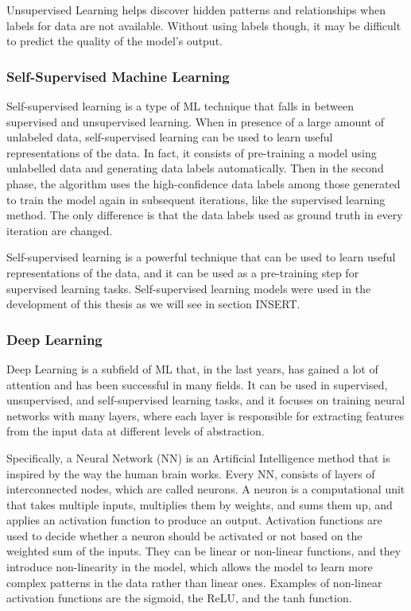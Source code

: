 Unsupervised Learning helps discover hidden patterns and relationships when labels for data are not available.
Without using labels though, it may be difficult to predict the quality of the model's output.





\subsubsection{Self-Supervised Machine Learning}
\label{sec:semisupervised_ml}
Self-supervised learning is a type of ML technique that falls in between supervised and unsupervised learning.
When in presence of a large amount of unlabeled data, self-supervised learning can be used to learn useful representations of the data.
In fact, it consists of pre-training a model using unlabelled data and generating data labels automatically. Then in the second phase, the algorithm uses the high-confidence data labels among those generated to train the model again in subsequent iterations, like the supervised learning method. The only difference is that the data labels used as ground truth in every iteration are changed.

Self-supervised learning is a powerful technique that can be used to learn useful representations of the data, and it can be used as a pre-training step for supervised learning tasks.
Self-supervised learning models were used in the development of this thesis as we will see in section INSERT.



\subsubsection{Deep Learning}
\label{sec:dl}
Deep Learning is a subfield of ML that, in the last years, has gained a lot of attention and has been successful in many fields.
It can be used in supervised, unsupervised, and self-supervised learning tasks, and it focuses on training neural networks with many layers, where each layer is responsible for extracting features from the input data at different levels of abstraction.

Specifically, a Neural Network (NN) is an Artificial Intelligence method that is inspired by the way the human brain works.
Every NN, consists of layers of interconnected nodes, which are called neurons.
A neuron is a computational unit that takes multiple inputs, multiplies them by weights, and sums them up, and applies an activation function to produce an output.
Activation functions are used to decide whether a neuron should be activated or not based on the weighted sum of the inputs.
They can be linear or non-linear functions, and they introduce non-linearity in the model, which allows the model to learn more complex patterns in the data rather than linear ones.
Examples of non-linear activation functions are the sigmoid, the ReLU, and the tanh function.

